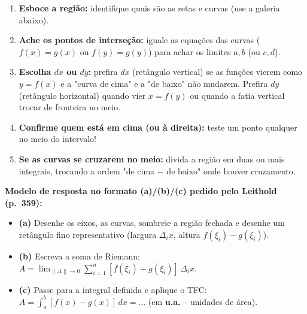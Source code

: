 \documentclass[10pt,a4paper]{article}
\begin{document}
\begin{dica}
    \begin{enumerate}
        \item \textbf{Esboce a região:} identifique quais são as retas e curvas (use a galeria abaixo).
        \item \textbf{Ache os pontos de interseção:} iguale as equações das curvas ($f(x) = g(x)$ ou $f(y)=g(y)$) para achar os limites $a, b$ (ou $c, d$).
        \item \textbf{Escolha $dx$ ou $dy$:} prefira $dx$ (retângulo vertical) se as funções vierem como $y = f(x)$ e a "curva de cima" e a "de baixo" não mudarem. Prefira $dy$ (retângulo horizontal) quando vier $x = f(y)$ ou quando a fatia vertical trocar de fronteira no meio.
        \item \textbf{Confirme quem está em cima (ou à direita):} teste um ponto qualquer no meio do intervalo!
        \item \textbf{Se as curvas se cruzarem no meio:} divida a região em duas ou mais integrais, trocando a ordem "de cima $-$ de baixo" onde houver cruzamento.
    \end{enumerate}
    \textbf{Modelo de resposta no formato (a)/(b)/(c) pedido pelo Leithold (p.\ 359):}
    \begin{itemize}
        \item \textbf{(a)} Desenhe os eixos, as curvas, sombreie a região fechada e desenhe um retângulo fino representativo (largura $\Delta_i x$, altura $f(\xi_i) - g(\xi_i)$).
        \item \textbf{(b)} Escreva a soma de Riemann: $A = \lim_{\|\Delta\| \to 0} \sum_{i=1}^{n} [f(\xi_i) - g(\xi_i)]\,\Delta_i x$.
        \item \textbf{(c)} Passe para a integral definida e aplique o TFC: $A = \int_{a}^{b} [f(x) - g(x)]\,dx = \dots$ (em \textbf{u.a.} -- unidades de área).
    \end{itemize}
\end{dica}
\end{document}
